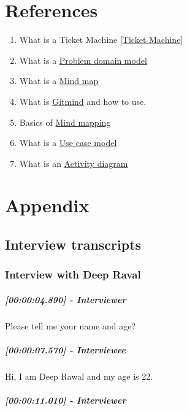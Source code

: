 \documentclass[a4paper,12pt]{article}
\begin{document}
\section{References}
\begin{enumerate}
    \item What is a Ticket Machine [\href{https://en.wikipedia.org/wiki/Ticket_machine}{Ticket Machine}]
    \item What is a  \href{https://www.businessprocessglossary.com/9158/problem-domain#:~:text=1%20Definition,internal%20and%20external%20project%20stakeholders.}{Problem domain model}
    \item What is a \href{https://www.mindmapping.com/mind-map}{Mind map}
    \item What is \href{https://gitmind.com/}{Gitmind} and how to use.
    \item Basics of  \href{https://simplemind.eu/how-to-mind-map/basics/}{Mind mapping}
    \item What is a  \href{https://www.utm.mx/~caff/doc/OpenUPWeb/openup/guidances/concepts/use_case_model_CD178AF9.html#:~:text=A%20use%2Dcase%20model%20is,system%20in%20satisfying%20these%20goals.}{Use case model}
    \item What is an \href{https://www.visual-paradigm.com/guide/uml-unified-modeling-language/what-is-activity-diagram/}{Activity diagram}
\end{enumerate}

\newpage
\section{Appendix}
\subsection{Interview transcripts}
\subsubsection{Interview with Deep Raval}

\hypertarget{interviewer}{%
\subparagraph{{[}00:00:04.890{]} - Interviewer}\label{interviewer}}

Please tell me your name and age?

\hypertarget{interviewee}{%
\subparagraph{{[}00:00:07.570{]} - Interviewee}\label{interviewee}}

Hi, I am Deep Rawal and my age is 22.

\hypertarget{interviewer-1}{%
\subparagraph{{[}00:00:11.010{]} - Interviewer}\label{interviewer-1}}
\end{document}
